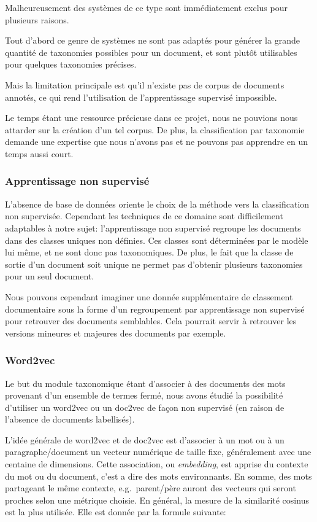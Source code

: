 Malheureusement des systèmes de ce type sont immédiatement exclus pour plusieurs raisons.

Tout d'abord ce genre de systèmes ne sont pas adaptés pour générer la grande quantité de taxonomies possibles pour un document, et sont plutôt utilisables pour quelques taxonomies précises.

Mais la limitation principale est qu'il n'existe pas de corpus de documents annotés, ce qui rend l'utilisation de l'apprentissage supervisé impossible.

Le temps étant une ressource précieuse dans ce projet, nous ne pouvions nous attarder sur la création d'un tel corpus.
De plus, la classification par taxonomie demande une expertise que nous n'avons pas et ne pouvons pas apprendre en un temps aussi court.

\subsubsection{Apprentissage non supervisé}
L'absence de base de données oriente le choix de la méthode vers la classification non supervisée.
Cependant les techniques de ce domaine sont difficilement adaptables à notre sujet: l'apprentissage non supervisé regroupe les documents dans des classes uniques non définies.
Ces classes sont déterminées par le modèle lui même, et ne sont donc pas taxonomiques.
De plus, le fait que la classe de sortie d'un document soit unique ne permet pas d'obtenir plusieurs taxonomies pour un seul document.

Nous pouvons cependant imaginer une donnée supplémentaire de classement documentaire sous la forme d'un regroupement par apprentissage non supervisé pour retrouver des documents semblables.
Cela pourrait servir à retrouver les versions mineures et majeures des documents par exemple.


\subsubsection{Word2vec}
Le but du module taxonomique étant d'associer à des documents des mots provenant d'un ensemble de termes fermé, nous avons étudié la possibilité d'utiliser un word2vec\cite{word2vec} ou un doc2vec de façon non supervisé (en raison de l'absence de documents labellisés).

L'idée générale de word2vec et de doc2vec est d'associer à un mot ou à un paragraphe/document un vecteur numérique de taille fixe, généralement avec une centaine de dimensions.
Cette association, ou \textit{embedding}, est apprise du contexte du mot ou du document, c'est a dire des mots environnants.
En somme, des mots partageant le même contexte, e.g.\ parent/père auront des vecteurs qui seront proches selon une métrique choisie.
En général, la mesure de la similarité cosinus est la plus utilisée.
Elle est donnée par la formule suivante:

